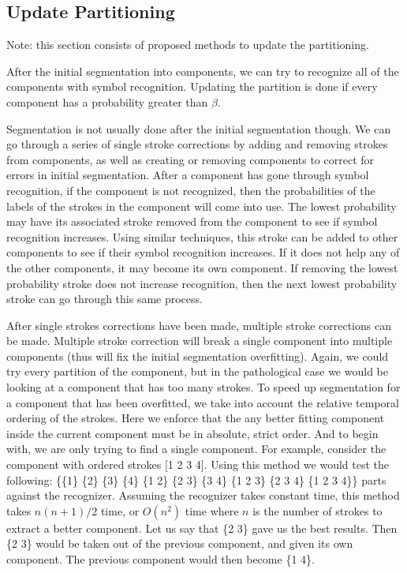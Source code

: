 \documentclass[10pt]{acmsiggraph}               %
\begin{document}
\subsection{Update Partitioning}
Note: this section consists of proposed methods to update the partitioning.

After the initial segmentation into components, we can try to recognize all of the components with symbol recognition.
Updating the partition is done if every component has a probability greater than $\beta$.

Segmentation is not usually done after the initial segmentation though.
We can go through a series of single stroke corrections by adding and removing strokes from components, as well as creating or removing components to correct for errors in initial segmentation.
After a component has gone through symbol recognition, if the component is not recognized, then the probabilities of the labels of the strokes in the component will come into use.
The lowest probability may have its associated stroke removed from the component to see if symbol recognition increases.
Using similar techniques, this stroke can be added to other components to see if their symbol recognition increases.
If it does not help any of the other components, it may become its own component.
If removing the lowest probability stroke does not increase recognition, then the next lowest probability stroke can go through this same process.

After single strokes corrections have been made, multiple stroke corrections can be made.
Multiple stroke correction will break a single component into multiple components (thus will fix the initial segmentation overfitting).
Again, we could try every partition of the component, but in the pathological case we would be looking at a component that has too many strokes.
To speed up segmentation for a component that has been overfitted, we take into account the relative temporal ordering of the strokes.
Here we enforce that the any better fitting component inside the current component must be in absolute, strict order.
And to begin with, we are only trying to find a single component.
For example, consider the component with ordered strokes [1 2 3 4].
Using this method we would test the following: \{\{1\} \{2\} \{3\} \{4\} \{1 2\} \{2 3\} \{3 4\} \{1 2 3\} \{2 3 4\} \{1 2 3 4\}\} parts against the recognizer.
Assuming the recognizer takes constant time, this method takes $n(n+1)/2$ time, or $O(n^2)$ time where $n$ is the number of strokes to extract a better component.
Let us say that \{2 3\} gave us the best results.
Then \{2 3\} would be taken out of the previous component, and given its own component.
The previous component would then become \{1 4\}.
\end{document}
